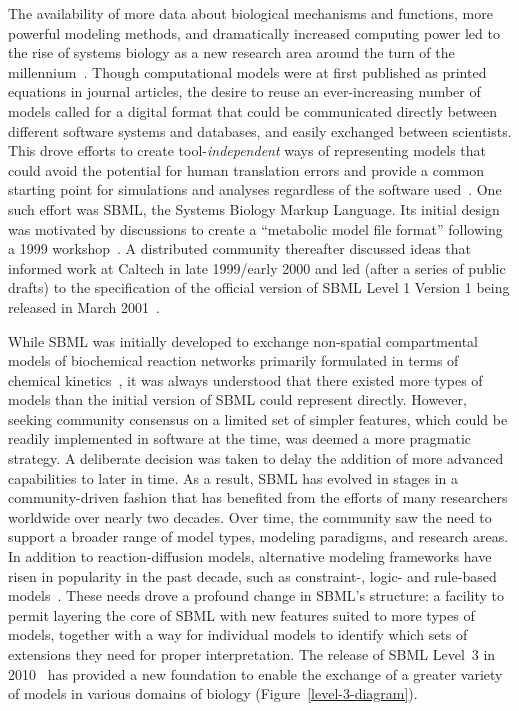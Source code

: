 \documentclass[]{draft-sbml-paper}
\begin{document}
The availability of more data about biological mechanisms and functions, more powerful modeling methods, and dramatically increased computing power led to the rise of systems biology as a new research area around the turn of the millennium~\citep{kitano2000perspectives, ideker2001new}. Though computational models were at first published as printed equations in journal articles, the desire to reuse an ever-increasing number of models called for a digital format that could be communicated directly between different software systems and databases, and easily exchanged between scientists. This drove efforts to create tool-\emph{independent} ways of representing models that could avoid the potential for human translation errors and provide a common starting point for simulations and analyses regardless of the software used~\citep{Lloyd2004-fd, Goddard2001-ix, hucka_2001}. One such effort was SBML, the Systems Biology Markup Language. Its initial design was motivated by discussions to create a ``metabolic model file format'' following a 1999 workshop~\citep{Cornish-Bowden2000technological}. A distributed community thereafter discussed ideas that informed work at Caltech in late 1999/early 2000 and led (after a series of public drafts) to the specification of the official version of SBML Level 1 Version 1 being released in March 2001~\citep{hucka_2003}.

While SBML was initially developed to exchange non-spatial compartmental models of biochemical reaction networks primarily formulated in terms of chemical kinetics~\citep{hucka_2002}, it was always understood that there existed more types of models than the initial version of SBML could represent directly. However, seeking community consensus on a limited set of simpler features, which could be readily implemented in software at the time, was deemed a more pragmatic strategy. A deliberate decision was taken to delay the addition of more advanced capabilities to later in time.  As a result, SBML has evolved in stages in a community-driven fashion that has benefited from the efforts of many researchers worldwide over nearly two decades.  Over time, the community saw the need to support a broader range of model types, modeling paradigms, and research areas. In addition to reaction-diffusion models, alternative modeling frameworks have risen in popularity in the past decade, such as constraint-, logic- and rule-based models~\citep{Machado2011modelinga}. These needs drove a profound change in SBML's structure: a facility to permit layering the core of SBML with new features suited to more types of models, together with a way for individual models to identify which sets of extensions they need for proper interpretation. The release of SBML Level~3 in 2010~\citep{Hucka2015} has provided a new foundation to enable the exchange of a greater variety of models in various domains of biology (Figure~\ref{level-3-diagram}).
\end{document}
